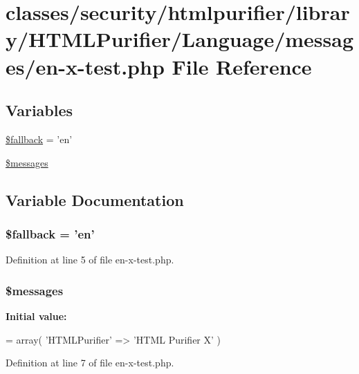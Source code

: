 \hypertarget{messages_2en-x-test_8php}{\section{classes/security/htmlpurifier/library/\+H\+T\+M\+L\+Purifier/\+Language/messages/en-\/x-\/test.php File Reference}
\label{messages_2en-x-test_8php}
}
\subsection*{Variables}
\begin{DoxyCompactItemize}
\item 
\hyperlink{messages_2en-x-test_8php_a0aa2d1acd291d3fedc1a3617d716e28e}{\$fallback} = 'en'
\item 
\hyperlink{messages_2en-x-test_8php_a21a183f927a6d243fe6b4ba3a6c4d4c8}{\$messages}
\end{DoxyCompactItemize}


\subsection{Variable Documentation}
\hypertarget{messages_2en-x-test_8php_a0aa2d1acd291d3fedc1a3617d716e28e}{
\subsubsection[{\$fallback}]{\setlength{\rightskip}{0pt plus 5cm}\$fallback = 'en'}}\label{messages_2en-x-test_8php_a0aa2d1acd291d3fedc1a3617d716e28e}


Definition at line 5 of file en-\/x-\/test.\+php.

\hypertarget{messages_2en-x-test_8php_a21a183f927a6d243fe6b4ba3a6c4d4c8}{
\subsubsection[{\$messages}]{\setlength{\rightskip}{0pt plus 5cm}\$messages}}\label{messages_2en-x-test_8php_a21a183f927a6d243fe6b4ba3a6c4d4c8}
{\bfseries Initial value\+:}
\begin{DoxyCode}
= array(
    \textcolor{stringliteral}{'HTMLPurifier'} => \textcolor{stringliteral}{'HTML Purifier X'}
)
\end{DoxyCode}


Definition at line 7 of file en-\/x-\/test.\+php.

